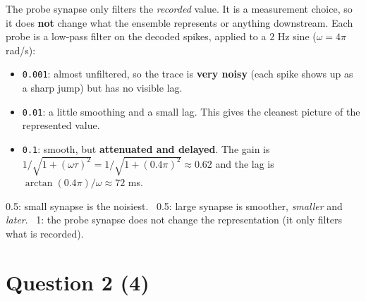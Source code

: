\documentclass[11pt,letterpaper]{article}
\newcommand{\ans}[1]{\par\vspace{4pt}{\bfseries #1}\quad}
\begin{document}
\ans{(b) [2]}
The probe synapse only filters the \emph{recorded} value. It is a measurement choice, so it does \textbf{not} change what the ensemble represents or anything downstream. Each probe is a low-pass filter on the decoded spikes, applied to a $2$ Hz sine ($\omega = 4\pi$ rad/s):
\begin{itemize}[leftmargin=1.2em]
\item \texttt{0.001}: almost unfiltered, so the trace is \textbf{very noisy} (each spike shows up as a sharp jump) but has no visible lag.
\item \texttt{0.01}: a little smoothing and a small lag. This gives the cleanest picture of the represented value.
\item \texttt{0.1}: smooth, but \textbf{attenuated and delayed}. The gain is $1/\sqrt{1 + (\omega\tau)^2} = 1/\sqrt{1 + (0.4\pi)^2} \approx 0.62$ and the lag is $\arctan(0.4\pi)/\omega \approx 72$ ms.
\end{itemize}
\begin{center}
\end{center}
\begin{marking}
0.5: small synapse is the noisiest. \ 0.5: large synapse is smoother, \emph{smaller} and \emph{later}. \ 1: the probe synapse does not change the representation (it only filters what is recorded).
\end{marking}

\section*{Question 2 \hfill (4)}
\end{document}
